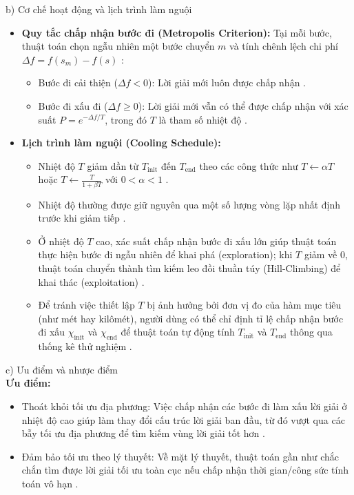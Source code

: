 \documentclass[14pt,a4paper]{extarticle}
\begin{document}
\noindent b) Cơ chế hoạt động và lịch trình làm nguội
\begin{itemize}
    \item \textbf{Quy tắc chấp nhận bước đi (Metropolis Criterion):} Tại mỗi bước, thuật toán chọn ngẫu nhiên một bước chuyển $m$ và tính chênh lệch chi phí $\Delta f = f(s_m) - f(s)$ \cite{Taillard2023}:
    \begin{itemize}
        \item Bước đi cải thiện ($\Delta f < 0$): Lời giải mới luôn được chấp nhận \cite{Taillard2023}.
        \item Bước đi xấu đi ($\Delta f \ge 0$): Lời giải mới vẫn có thể được chấp nhận với xác suất $P = e^{-\Delta f / T}$, trong đó $T$ là tham số nhiệt độ \cite{Luke2009}.
    \end{itemize}
    \item \textbf{Lịch trình làm nguội (Cooling Schedule):}
    \begin{itemize}
        \item Nhiệt độ $T$ giảm dần từ $T_{\text{init}}$ đến $T_{\text{end}}$ theo các công thức như $T \leftarrow \alpha T$ hoặc $T \leftarrow \frac{T}{1 + \beta T}$ với $0 < \alpha < 1$ \cite{Taillard2023}.
        \item Nhiệt độ thường được giữ nguyên qua một số lượng vòng lặp nhất định trước khi giảm tiếp \cite{Taillard2023}.
        \item Ở nhiệt độ $T$ cao, xác suất chấp nhận bước đi xấu lớn giúp thuật toán thực hiện bước đi ngẫu nhiên để khai phá (exploration); khi $T$ giảm về $0$, thuật toán chuyển thành tìm kiếm leo đồi thuần túy (Hill-Climbing) để khai thác (exploitation) \cite{Luke2009}.
        \item Để tránh việc thiết lập $T$ bị ảnh hưởng bởi đơn vị đo của hàm mục tiêu (như mét hay kilômét), người dùng có thể chỉ định tỉ lệ chấp nhận bước đi xấu $\chi_{\text{init}}$ và $\chi_{\text{end}}$ để thuật toán tự động tính $T_{\text{init}}$ và $T_{\text{end}}$ thông qua thống kê thử nghiệm \cite{Taillard2023}.
    \end{itemize}
\end{itemize}

\noindent c) Ưu điểm và nhược điểm
\\
\textbf{Ưu điểm:}
\begin{itemize}
    \item Thoát khỏi tối ưu địa phương: Việc chấp nhận các bước đi làm xấu lời giải ở nhiệt độ cao giúp làm thay đổi cấu trúc lời giải ban đầu, từ đó vượt qua các bẫy tối ưu địa phương để tìm kiếm vùng lời giải tốt hơn \cite{Taillard2023, Luke2009}.
    \item Đảm bảo tối ưu theo lý thuyết: Về mặt lý thuyết, thuật toán gần như chắc chắn tìm được lời giải tối ưu toàn cục nếu chấp nhận thời gian/công sức tính toán vô hạn \cite{Taillard2023}.
\end{itemize}
\end{document}
